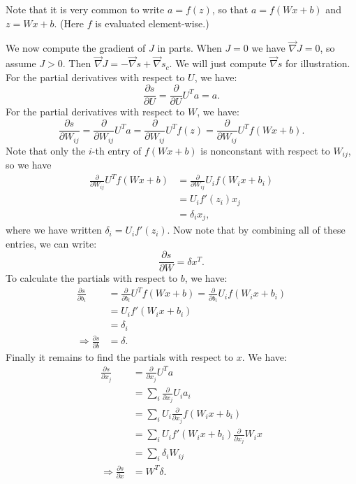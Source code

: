 Note that it is very common to write $a = f(z)$, so that $a = f(Wx + b)$ and $z = Wx + b$. (Here $f$ is evaluated element-wise.)

We now compute the gradient of $J$ in parts. When $J = 0$ we have $\vec{\nabla} J = 0$, so assume $J > 0$. Then $\vec{\nabla} J = -\vec{\nabla}s + \vec{\nabla}s_c$. We will just compute $\vec{\nabla}s$ for illustration. For the partial derivatives with respect to $U$, we have:
$$\frac{\partial s}{\partial U} = \frac{\partial}{\partial U} U^Ta = a.$$
For the partial derivatives with respect to $W$, we have:
$$\frac{\partial s}{\partial W_{ij}} = \frac{\partial}{\partial W_{ij}} U^Ta = \frac{\partial}{\partial W_{ij}}U^Tf(z) = \frac{\partial}{\partial W_{ij}} U^Tf(Wx + b).$$
Note that only the $i$-th entry of $f(Wx + b)$ is nonconstant with respect to $W_{ij}$, so we have
\begin{align*}
\frac{\partial}{\partial W_{ij}} U^Tf(Wx + b) &= \frac{\partial}{\partial W_{ij}} U_if(W_ix + b_i)\\
&= U_if'(z_i)x_j\\
&= \delta_ix_j,
\end{align*}
where we have written $\delta_i = U_if'(z_i)$. Now note that by combining all of these entries, we can write:
$$\frac{\partial s}{\partial W} = \delta x^T.$$
To calculate the partials with respect to $b$, we have:
\begin{align*}
\frac{\partial s}{\partial b_i} &= \frac{\partial}{\partial b_i}U^Tf(Wx + b) = \frac{\partial}{\partial b_i} U_if(W_ix + b_i)\\
&= U_if'(W_ix + b_i)\\
&= \delta_i\\
\Rightarrow \frac{\partial s}{\partial b} &= \delta.
\end{align*}
Finally it remains to find the partials with respect to $x$. We have:
\begin{align*}
\frac{\partial s}{\partial x_j} &= \frac{\partial}{\partial x_j} U^Ta \\
&= \sum_i \frac{\partial}{\partial x_j} U_ia_i\\
&= \sum_i U_i\frac{\partial}{\partial x_j} f(W_ix + b_i)\\
&= \sum_i U_i f'(W_ix + b_i) \frac{\partial}{\partial x_j} W_ix\\
&= \sum_i \delta_iW_{ij}\\
\Rightarrow \frac{\partial s}{\partial x} &= W^T\delta.
\end{align*}

